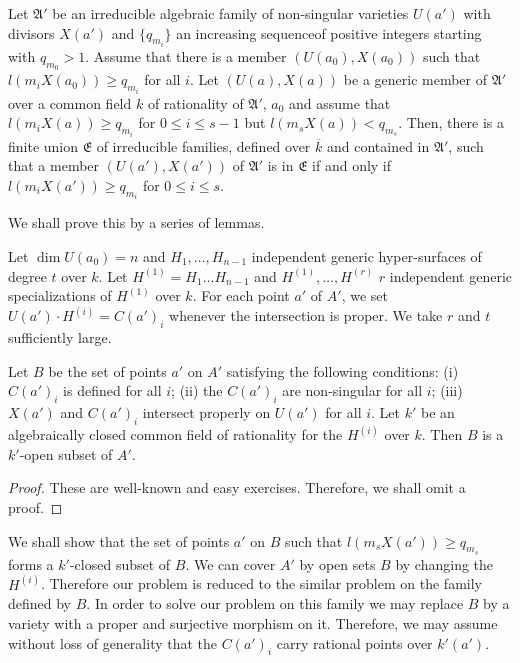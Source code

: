 \begin{subprop}\label{art14-app-prop1.1}
Let $\mathfrak{A}'$ be an irreducible algebraic family of non-singular varieties $U(a')$ with divisors $X(a')$ and $\{q_{m_{i}}\}$ an increasing sequence\pageoriginale of positive integers starting with $q_{m_{0}}>1$. Assume that there is a member $(U(a_{0}), X(a_{0}))$ such that $l(m_{i}X(a_{0}))\geq q_{m_{i}}$ for all $i$. Let $(U(a), X(a))$ be a generic member of $\mathfrak{A}'$ over a common field $k$ of rationality of $\mathfrak{A}'$, $a_{0}$ and assume that $l(m_{i}X(a))\geq q_{m_{i}}$ for $0\leq i\leq s-1$ but $l(m_{s}X(a))<q_{m_{s}}$. Then, there is a finite union $\mathfrak{E}$ of irreducible families, defined over $\overline{k}$ and contained in $\mathfrak{A}'$, such that a member $(U(a'),X(a'))$ of $\mathfrak{A}'$ is in $\mathfrak{E}$ if and only if $l(m_{i}X(a'))\geq q_{m_{i}}$ for $0\leq i\leq s$.
\end{subprop}

We shall prove this by a series of lemmas.

Let $\dim U(a_{0})=n$ and $H_{1},\ldots,H_{n-1}$ independent generic hyper-surfaces of degree $t$ over $k$. Let $H^{(1)}=H_{1}\ldots H_{n-1}$ and $H^{(1)},\ldots,H^{(r)}$ $r$ independent generic specializations of $H^{(1)}$ over $k$. For each point $a'$ of $A'$, we set $U(a')\cdot H^{(i)}=C(a')_{i}$ whenever the intersection is proper. We take $r$ and $t$ sufficiently large.

\begin{sublemma}\label{art14-lem1.2}
Let $B$ be the set of points $a'$ on $A'$ satisfying the following conditions: {\rm(i)} $C(a')_{i}$ is defined for all $i$; {\rm(ii)} the $C(a')_{i}$ are non-singular for all $i$; {\rm(iii)} $X(a')$ and $C(a')_{i}$ intersect properly on $U(a')$ for all $i$. Let $k'$ be an algebraically closed common field of rationality for the $H^{(i)}$ over $k$. Then $B$ is a $k'$-open subset of $A'$.
\end{sublemma}

\begin{proof}
These are well-known and easy exercises. Therefore, we shall omit a proof.
\end{proof}

We shall show that the set of points $a'$ on $B$ such that $l(m_{s}X(a'))\geq q_{m_{s}}$ forms a $k'$-closed subset of $B$. We can cover $A'$ by open sets $B$ by changing the $H^{(i)}$. Therefore our problem is reduced to the similar problem on the family defined by $B$. In order to solve our problem on this family we may replace $B$ by a variety with a proper and surjective morphism on it. Therefore, we may assume without loss of generality that the $C(a')_{i}$ carry rational points over $k'(a')$.

